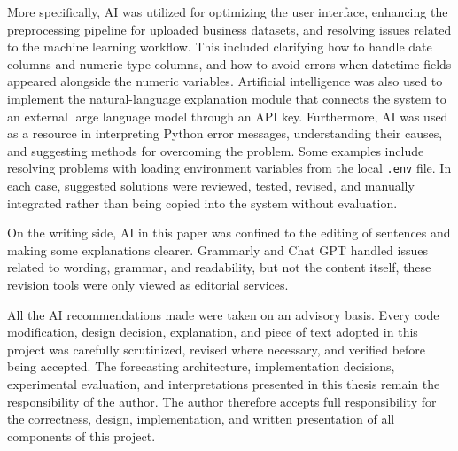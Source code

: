 \documentclass[12pt]{article}
\begin{document}
More specifically, AI was utilized for optimizing the user interface, enhancing the preprocessing pipeline for uploaded business datasets, and resolving issues related to the machine learning workflow. This included clarifying how to handle date columns and numeric-type columns, and how to avoid errors when datetime fields appeared alongside the numeric variables.
Artificial intelligence was also used to implement the natural-language explanation module that connects the system to an external large language model through an API key.
Furthermore, AI was used as a resource in interpreting Python error messages, understanding their causes, and suggesting methods for overcoming the problem. Some examples include resolving problems with loading environment variables from the local \texttt{.env} file. In each case, suggested solutions were reviewed, tested, revised, and manually integrated rather than being copied into the system without evaluation.

On the writing side, AI in this paper was confined to the editing of sentences and making some explanations clearer. Grammarly and Chat GPT handled issues related to wording, grammar, and readability, but not the content itself, these revision tools were only viewed as editorial services.

All the AI recommendations made were taken on an advisory basis. Every code modification, design decision, explanation, and piece of text adopted in this project was carefully scrutinized, revised where necessary, and verified before being accepted.  The forecasting architecture, implementation decisions, experimental evaluation, and interpretations presented in this thesis remain the responsibility of the author. The author therefore accepts full responsibility for the correctness, design, implementation, and written presentation of all components of this project.



\end{document}
